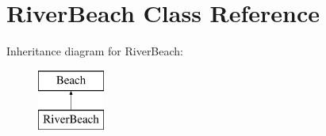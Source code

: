 \hypertarget{class_river_beach}{}\section{River\+Beach Class Reference}
\label{class_river_beach}
Inheritance diagram for River\+Beach\+:\begin{figure}[H]
\begin{center}
\leavevmode
\includegraphics[height=2.000000cm]{class_river_beach}
\end{center}
\end{figure}
